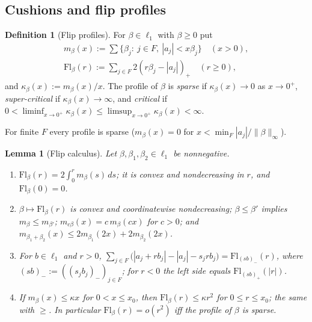 \documentclass[10pt]{amsart}
\newtheorem{lemma}[theorem]{Lemma}
\theoremstyle{definition}
\newtheorem{definition}[theorem]{Definition}
\theoremstyle{remark}
\begin{document}
\subsection{Cushions and flip profiles}\label{subsec:II-cushion}

\begin{definition}[Flip profiles]\label{def:II-flip}
For $\beta\in\ell_1$ with $\beta\ge0$ put
\begin{gather*}
 m_\beta(x):=\sum\{\beta_j:\ j\in F,\ |a_j|<x\beta_j\}\quad(x>0),\\
 \mathrm{Fl}_\beta(r):=\sum_{j\in F}2(r\beta_j-|a_j|)_+\quad(r\ge0),
\end{gather*}
and $\kappa_\beta(x):=m_\beta(x)/x$.  The profile of $\beta$ is
\emph{sparse} if $\kappa_\beta(x)\to0$ as $x\to0^+$, \emph{super-critical}
if $\kappa_\beta(x)\to\infty$, and \emph{critical} if $0<\liminf_{x\to0^+}
\kappa_\beta(x)\le\limsup_{x\to0^+}\kappa_\beta(x)<\infty$.
\end{definition}

For finite $F$ every profile is sparse ($m_\beta(x)=0$ for
$x<\min_F|a_j|/\|\beta\|_\infty$).

\begin{lemma}[Flip calculus]\label{lem:II-flipcalc}
Let $\beta,\beta_1,\beta_2\in\ell_1$ be nonnegative.
\begin{enumerate}
\item[(a)] $\mathrm{Fl}_\beta(r)=2\int_0^rm_\beta(s)\,ds$; it is convex and
nondecreasing in $r$, and $\mathrm{Fl}_\beta(0)=0$.
\item[(b)] $\beta\mapsto\mathrm{Fl}_\beta(r)$ is convex and coordinatewise
nondecreasing; $\beta\le\beta'$ implies $m_\beta\le m_{\beta'}$;
$m_{c\beta}(x)=c\,m_\beta(cx)$ for $c>0$; and
$m_{\beta_1+\beta_2}(x)\le2m_{\beta_1}(2x)+2m_{\beta_2}(2x)$.
\item[(c)] For $b\in\ell_1$ and $r>0$,
$\sum_{j\in F}\big(|a_j+rb_j|-|a_j|-s_jrb_j\big)=\mathrm{Fl}_{(sb)_-}(r)$,
where $(sb)_-:=((s_jb_j)_-)_{j\in F}$; for $r<0$ the left side equals
$\mathrm{Fl}_{(sb)_+}(|r|)$.
\item[(d)] If $m_\beta(x)\le\kappa x$ for $0<x\le x_0$, then
$\mathrm{Fl}_\beta(r)\le\kappa r^2$ for $0\le r\le x_0$; the same with
$\ge$.  In particular $\mathrm{Fl}_\beta(r)=o(r^2)$ iff the profile of $\beta$
is sparse.
\end{enumerate}
\end{lemma}
\end{document}

